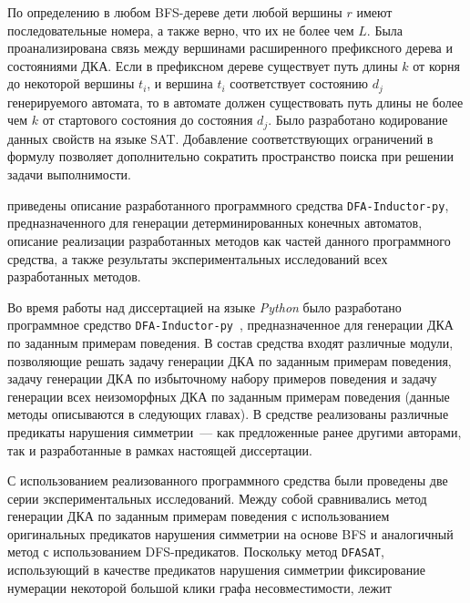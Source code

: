 По определению в любом BFS-дереве дети любой вершины $r$ имеют последовательные номера, а также верно, что их не более чем $L$.
Была проанализирована связь между вершинами расширенного префиксного дерева и состояниями ДКА.
Если в префиксном дереве существует путь длины $k$ от корня до некоторой вершины $t_{i}$, и вершина $t_{i}$ соответствует состоянию $d_{j}$ генерируемого автомата, то в автомате должен существовать путь длины не более чем $k$ от стартового состояния до состояния $d_{j}$.
Было разработано кодирование данных свойств на языке SAT.
Добавление соответствующих ограничений в формулу позволяет дополнительно сократить пространство поиска при решении задачи выполнимости.

\insection{\ref{sec:space:results}} приведены описание разработанного программного средства \texttt{DFA-Inductor-py}, предназначенного для генерации детерминированных конечных автоматов, описание реализации разработанных методов как частей данного программного средства, а также результаты экспериментальных исследований всех разработанных методов.

Во время работы над диссертацией на языке \emph{Python} было разработано программное средство \texttt{DFA-Inductor-py}~\cite{dfa-inductor-py}, предназначенное для генерации ДКА по заданным примерам поведения.
В состав средства входят различные модули, позволяющие решать задачу генерации ДКА по заданным примерам поведения, задачу генерации ДКА по избыточному набору примеров поведения и задачу генерации всех неизоморфных ДКА по заданным примерам поведения (данные методы описываются в следующих главах).
В средстве реализованы различные предикаты нарушения симметрии~--- как предложенные ранее другими авторами, так и разработанные в рамках настоящей диссертации.

С использованием реализованного программного средства были проведены две серии экспериментальных исследований.
Между собой сравнивались метод генерации ДКА по заданным примерам поведения с использованием оригинальных предикатов нарушения симметрии на основе BFS и аналогичный метод с использованием DFS-предикатов.
Поскольку метод \texttt{DFASAT}, использующий в качестве предикатов нарушения симметрии фиксирование нумерации некоторой большой клики графа несовместимости, лежит 

